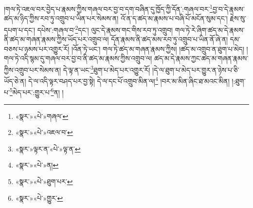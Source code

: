 །གལ་ཏེ་འཇལ་བར་བྱེད་པ་རྣམས་ཀྱིས་གཞལ་བར་བྱ་བ་དག་བཞིན་དུ་ཁྱོད་ཀྱི་དོན་:གཞལ་བར་\footnote{«སྣར་»«པེ་»གཞལ་}བྱ་བ་དེ་རྣམས་ཚད་མ་ཉིད་ཀྱིས་རབ་ཏུ་འགྲུབ་པ་ཡིན་པར་སེམས་ན། འོ་ན་ད་ཚད་མ་རྣམས་པ་བཞི་པོ་མངོན་སུམ་དང་། རྗེས་སུ་དཔག་པ་དང་། དཔེས་:གཞལ་བ་\footnote{«སྣར་»«པེ་»འཇལ་བ་}དང་། ལུང་དེ་རྣམས་གང་གིས་རབ་ཏུ་འགྲུབ། གལ་ཏེ་རེ་ཞིག་ཚད་མ་དེ་རྣམས་ནི་ཚད་མ་གཞན་རྣམས་ཀྱིས་ཡོད་པར་འགྲུབ་ལ། དོན་རྣམས་ནི་ཚད་མས་རབ་ཏུ་འགྲུབ་པ་ཡིན་ནོ་ཞེ་ན། དམ་བཅས་པ་ཉམས་པར་འགྱུར་རོ། །འོན་ཏེ་ཡང་། གལ་ཏེ་ཚད་མ་གཞན་རྣམས་ཀྱིས། །ཚད་མ་འགྲུབ་ན་ཐུག་པ་མེད། །གལ་ཏེ་འདི་སྙམ་དུ་གཞལ་བར་བྱ་བ་ནི་ཚད་མ་རྣམས་ཀྱིས་འགྲུབ་ལ། ཚད་མ་དེ་རྣམས་ཀྱང་ཚད་མ་གཞན་རྣམས་ཀྱིས་འགྲུབ་པར་སེམས་ན། དེ་ལྟ་ན་ཡང་\footnote{«སྣར་»ལྟར་ན་«པེ་»ལྟ་ན་}ཐུག་པ་མེད་པར་འགྱུར་རོ། །དེ་ལ་ཐུག་པ་མེད་པར་གྱུར་ན་ཉེས་པ་ཅི་ཡོད་ཅེ་ན། དེ་ལ་འདི་ལྟར་བཤད་པར་བྱ་སྟེ། དེ་ལ་དང་པོ་འགྲུབ་མིན་ལ།\footnote{«སྣར་»«པེ་»ན།} །བར་མ་མིན་ཞིང་ཐ་མའང་མིན། །:ཐུག་པ་\footnote{«སྣར་»«པེ་»ཐུག་པར་}མེད་པར་:གྱུར་པ་\footnote{«སྣར་»«པེ་»གྱུར་}ན། །
